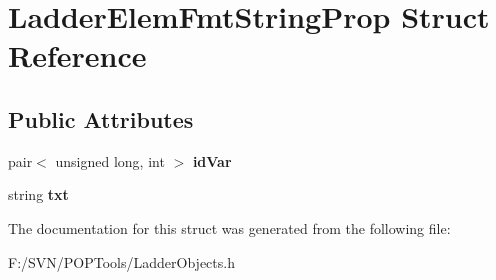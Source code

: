 \hypertarget{struct_ladder_elem_fmt_string_prop}{\section{Ladder\-Elem\-Fmt\-String\-Prop Struct Reference}
\label{struct_ladder_elem_fmt_string_prop}
}
\subsection*{Public Attributes}
\begin{DoxyCompactItemize}
\item 
\hypertarget{struct_ladder_elem_fmt_string_prop_a9a08c3dc9cf821c591284451e0123841}{pair$<$ unsigned long, int $>$ {\bfseries id\-Var}}\label{struct_ladder_elem_fmt_string_prop_a9a08c3dc9cf821c591284451e0123841}

\item 
\hypertarget{struct_ladder_elem_fmt_string_prop_ad90af2417d11c46db937e03a20087624}{string {\bfseries txt}}\label{struct_ladder_elem_fmt_string_prop_ad90af2417d11c46db937e03a20087624}

\end{DoxyCompactItemize}


The documentation for this struct was generated from the following file\-:\begin{DoxyCompactItemize}
\item 
F\-:/\-S\-V\-N/\-P\-O\-P\-Tools/Ladder\-Objects.\-h\end{DoxyCompactItemize}
